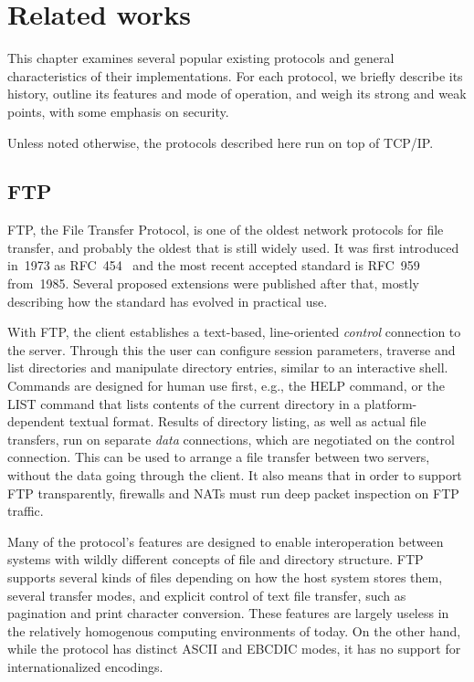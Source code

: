 
\chapter{Related works}

This chapter examines several popular existing protocols and general characteristics of their implementations.
For each protocol, we briefly describe its history, outline its features and mode of operation, and weigh its
strong and weak points, with some emphasis on security.

Unless noted otherwise, the protocols described here run on top of TCP/IP.

\section{FTP}

FTP, the File Transfer Protocol, is one of the oldest network protocols for file transfer, and probably the
oldest that is still widely used. It was first introduced in~1973 as RFC~454~\cite{rfc454} and the most recent
accepted standard is RFC~959~\cite{rfc959} from~1985. Several proposed extensions were published after that,
mostly describing how the standard has evolved in practical use.

With FTP, the client establishes a text-based, line-oriented {\it control} connection to the server. Through this
the user can configure session parameters, traverse and list directories and manipulate directory entries,
similar to an interactive shell. Commands are designed for human use first, e.g., the HELP command, or the
LIST command that lists contents of the current directory in a platform-dependent textual format. Results of
directory listing, as well as actual file transfers, run on separate {\it data} connections, which are
negotiated on the control connection. This can be used to arrange a file transfer between two servers, without
the data going through the client. It also means that in order to support FTP transparently, firewalls and
NATs must run deep packet inspection on FTP traffic.

Many of the protocol's features are designed to enable interoperation between systems with wildly different
concepts of file and directory structure. FTP supports several kinds of files depending on how the host system
stores them, several transfer modes, and explicit control of text file transfer, such as pagination and print
character conversion. These features are largely useless in the relatively homogenous computing environments
of today. On the other hand, while the protocol has distinct ASCII and EBCDIC modes, it has no support for
internationalized encodings.

